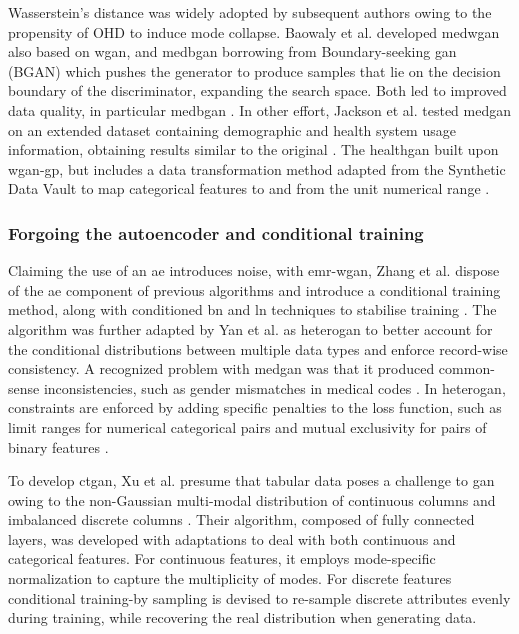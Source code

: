             Wasserstein's distance was widely adopted by subsequent authors owing to the propensity of OHD to induce mode collapse. Baowaly et al. developed \gls{medwgan} also based on \gls{wgan}, and \gls{medbgan} borrowing from Boundary-seeking \gls{gan} (BGAN) \cite{hjelm2017boundaryseeking} which pushes the generator to produce samples that lie on the decision boundary of the discriminator, expanding the search space. Both led to improved data quality, in particular \gls{medbgan} \cite{baowaly_2019_IEEE,baowaly_2019_jamia}. In other effort, Jackson et al. tested \gls{medgan} on an extended dataset containing demographic and health system usage information, obtaining results similar to the original \cite{Jackson_2019}. The \gls{healthgan} built upon \gls{wgan-gp}, but includes a data transformation method adapted from the Synthetic Data Vault \cite{Patki_2016} to map categorical features to and from the unit numerical range \cite{Yale_2020}. 
        
        \subsubsection{Forgoing the autoencoder and conditional training}\label{noauto}

            Claiming the use of an \gls{ae} introduces noise, with \gls{emr-wgan}, Zhang et al. dispose of the \gls{ae} component of previous algorithms and introduce a conditional training method, along with conditioned \gls{bn} and \gls{ln} techniques to stabilise training \cite{Zhang2020}. The algorithm was further adapted by Yan et al. as \gls{heterogan} to better account for the conditional distributions between multiple data types and enforce record-wise consistency. A recognized problem with \gls{medgan} was that it produced common-sense inconsistencies, such as gender mismatches in medical codes \cite{yan2020generating, Choi2017-nt}. In \gls{heterogan}, constraints are enforced by adding specific penalties to the loss function, such as limit ranges for numerical categorical pairs and mutual exclusivity for pairs of binary features \cite{yan2020generating}. \par

            To develop \gls{ctgan}, Xu et al. presume that tabular data poses a challenge to \gls{gan} owing to the non-Gaussian multi-modal distribution of continuous columns and imbalanced discrete columns \cite{Xu2019-ay}. Their algorithm, composed of fully connected layers, was developed with adaptations to deal with both continuous and categorical features. For continuous features, it employs mode-specific normalization to capture the multiplicity of modes. For discrete features conditional training-by sampling is devised to re-sample discrete attributes evenly during training, while recovering the real distribution when generating data.\par

